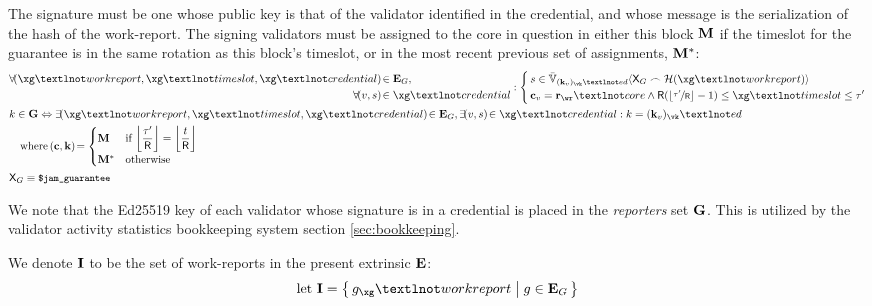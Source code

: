 The signature must be one whose public key is that of the validator identified in the credential, and whose message is the serialization of the hash of the work-report. The signing validators must be assigned to the core in question in either this block $\mathbf{M}$ if the timeslot for the guarantee is in the same rotation as this block's timeslot, or in the most recent previous set of assignments, $\mathbf{M}^*$:
\begin{align}\label{eq:guarantorsig}
  &\begin{aligned}
    &\begin{aligned}
      \forall \tup{\xg¬workreport, \xg¬timeslot, \xg¬credential} &\in \xtguarantees,\\
      \forall \tup{v, s} &\in \xg¬credential
    \end{aligned} :
      \abracegroup[\,]{
        &s \in \edsignature{(\mathbf{k}\sub{v})_\vk¬ed}{\Xguarantee\concat\blake{\xg¬workreport}}\\
        &\mathbf{c}\sub{v} = \wrX_\wr¬core \wedge \Crotationperiod(\floor{\nicefrac{\thetime'}{\Crotationperiod}} - 1) \le \xg¬timeslot \le \thetime'\\
      }\\
      &k \in \reporters \Leftrightarrow \exists \tup{\xg¬workreport, \xg¬timeslot, \xg¬credential} \in \xtguarantees, \exists \tup{v, s} \in \xg¬credential: k = (\mathbf{k}\sub{v})_\vk¬ed\\
      &\quad\where \tup{\mathbf{c}, \mathbf{k}} = \begin{cases}
        \guarantorassignments &\when \displaystyle \ffrac{\thetime'}{\Crotationperiod} = \ffrac{t}{\Crotationperiod} \\
        \guarantorassignmentsunderlastrotation &\otherwise
      \end{cases}
  \end{aligned}\\
  &\Xguarantee \equiv \token{\$jam\_guarantee}
\end{align}

We note that the Ed25519 key of each validator whose signature is in a credential is placed in the \emph{reporters} set $\mathbf{G}$. This is utilized by the validator activity statistics bookkeeping system section \ref{sec:bookkeeping}.

\newcommand*{\incomingcontexts}{\mathbf{x}}
\newcommand*{\incomingpackagehashes}{\mathbf{p}}

We denote $\mathbf{I}$ to be the set of work-reports in the present extrinsic $\mathbf{E}$:
\begin{align}\label{eq:incomingworkreports}
  \using\incomingreports = \set{ \build { \xgX_\xg¬workreport }{ \xgX \in \xtguarantees } }
\end{align}

